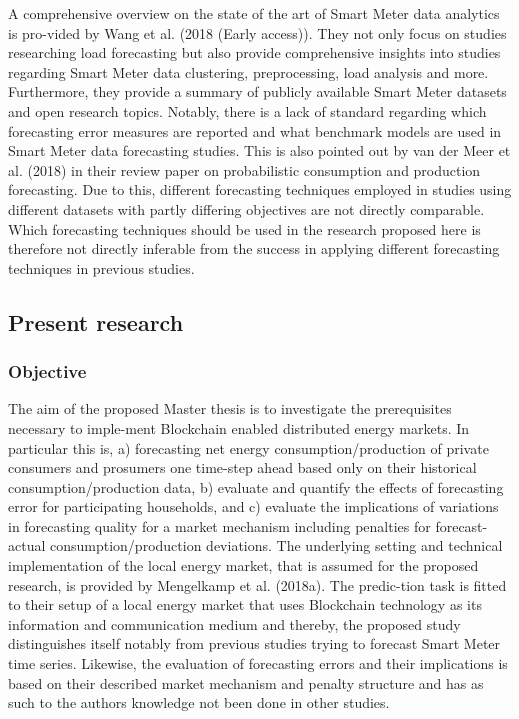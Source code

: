 A comprehensive overview on the state of the art of Smart Meter data analytics is pro-vided by Wang et al. (2018 (Early access)). They not only focus on studies researching load forecasting but also provide comprehensive insights into studies regarding Smart Meter data clustering, preprocessing, load analysis and more. Furthermore, they provide a summary of publicly available Smart Meter datasets and open research topics.
Notably, there is a lack of standard regarding which forecasting error measures are reported and what benchmark models are used in Smart Meter data forecasting studies. This is also pointed out by van der Meer et al. (2018) in their review paper on probabilistic consumption and production forecasting. Due to this, different forecasting techniques employed in studies using different datasets with partly differing objectives are not directly comparable. Which forecasting techniques should be used in the research proposed here is therefore not directly inferable from the success in applying different forecasting techniques in previous studies.



\subsection{Present research}\label{Sec:Intro;Subsec:Present}



\subsubsection{Objective}
The aim of the proposed Master thesis is to investigate the prerequisites necessary to imple-ment Blockchain enabled distributed energy markets. In particular this is,
a)	forecasting net energy consumption/production of private consumers and prosumers one time-step ahead based only on their historical consumption/production data,
b)	evaluate and quantify the effects of forecasting error for participating households, and
c)	evaluate the implications of variations in forecasting quality for a market mechanism including penalties for forecast-actual consumption/production deviations.
The underlying setting and technical implementation of the local energy market, that is assumed for the proposed research, is provided by Mengelkamp et al. (2018a). The predic-tion task is fitted to their setup of a local energy market that uses Blockchain technology as its information and communication medium and thereby, the proposed study distinguishes itself notably from previous studies trying to forecast Smart Meter time series. Likewise, the evaluation of forecasting errors and their implications is based on their described market mechanism and penalty structure and has as such to the authors knowledge not been done in other studies.


